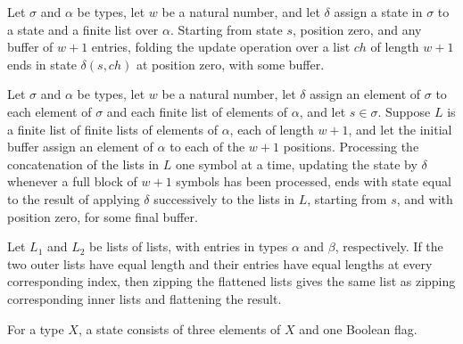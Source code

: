 \begin{lemma}
\label{Complexity.Codec.foldl_adStep_chunk}
\leanok
{}
Let $\sigma$ and $\alpha$ be types, let $w$ be a natural number, and let $\delta$ assign
a state in $\sigma$ to a state and a finite list over $\alpha$. Starting from state $s$,
position zero, and any buffer of $w+1$ entries, folding the update operation over a list
$ch$ of length $w+1$ ends in state $\delta(s,ch)$ at position zero, with some buffer.
\end{lemma}

\begin{theorem}
\label{Complexity.Codec.foldl_adStep_flatten}
\leanok
{}
Let $\sigma$ and $\alpha$ be types, let $w$ be a natural number, let $\delta$ assign an
element of $\sigma$ to each element of $\sigma$ and each finite list of elements of
$\alpha$, and let $s\in\sigma$. Suppose $L$ is a finite list of finite lists of elements
of $\alpha$, each of length $w+1$, and let the initial buffer assign an element of
$\alpha$ to each of the $w+1$ positions. Processing the concatenation of the lists in
$L$ one symbol at a time, updating the state by $\delta$ whenever a full block of $w+1$
symbols has been processed, ends with state equal to the result of applying $\delta$
successively to the lists in $L$, starting from $s$, and with position zero, for some
final buffer.
\end{theorem}

\begin{theorem}
\label{Complexity.Codec.zip_flatten}
\leanok
{}
Let $L_1$ and $L_2$ be lists of lists, with entries in types $\alpha$ and $\beta$,
respectively. If the two outer lists have equal length and their entries have equal
lengths at every corresponding index, then zipping the flattened lists gives the same
list as zipping corresponding inner lists and flattening the result.
\end{theorem}

\begin{definition}
\label{Complexity.Codec.SlSt}
\leanok
For a type $X$, a state consists of three elements of $X$ and one Boolean flag.
\end{definition}

